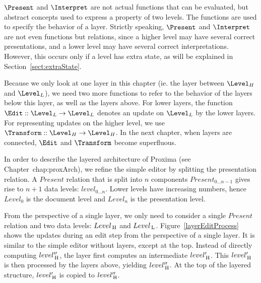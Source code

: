 \bc
$\Present$ and $\Interpret$ are not actual functions that can be evaluated, but abstract concepts used to express a property of two levels. The functions are used to specify the behavior of a layer.
Strictly speaking, $\Present$ and $\Interpret$ are not even functions but relations, since a higher level may have several correct presentations, and a lower level may have several correct interpretations. However, this occurs only if a level has extra state, as will be explained in Section~\ref{sect:extraState}. \ec

\bc Because we only look at one layer in this chapter (ie. the layer between $\Level_{H}$ and $\Level_{L}$), we need two more functions to refer to the behavior of the layers below this layer, as well as the layers above. For lower layers, the function 
$\Edit :: \Level_{L} \rightarrow \Level_{L}$ denotes an update on $\Level_{L}$ by the lower layers. For representing updates on the higher level, we use 
$\Transform :: \Level_{H} \rightarrow \Level_{H}$. In the next chapter, when layers are connected, $\Edit$ and $\Transform$ become superfluous.\ec



In order to describe the layered architecture of Proxima (see Chapter~{chap:proxArch}), we refine the simple editor by splitting the presentation relation. A  $Present$ relation that is split into $n$ components $Present_{0 \dots n-1}$ gives rise to $n+1$ data levels: $level_{0 \dots n}$. Lower levels have increasing numbers, hence $Level_{0}$ is the document level and $Level_{n}$ is the presentation level.

From the perspective of a single layer, we only need to consider a single $Present$ relation and two data levels: $Level_{\, \mathrm H}$ and $Level_{\, \mathrm L}$. Figure~\ref{layerEditProcess} shows the updates during an edit step from the perspective of a single layer. It is similar to the simple editor without layers, except at the top. Instead of directly computing $level''_{\, \mathrm H}$, the layer first computes an intermediate $level'_{\, \mathrm H}$. This $level'_{\, \mathrm H}$ is then processed by the layers above, yielding $level''_{\, \mathrm H}$. At the top of the layered structure, $level'_{\, \mathrm H}$ is copied to $level''_{\, \mathrm H}$. 


